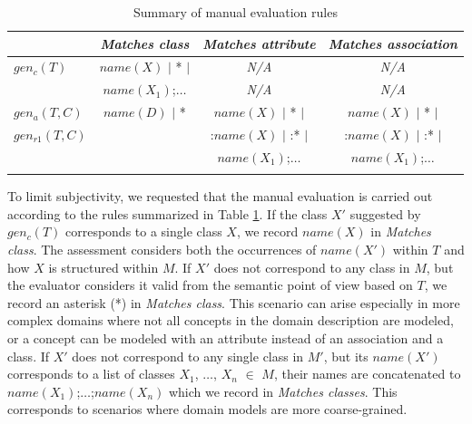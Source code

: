 \begin{table}[!h]
    \scriptsize
    \centering
    \setlength{\tabcolsep}{0.5em}
    \begin{tabular}{lccc}
                     & \emph{Matches class}        & \emph{Matches attribute} & \emph{Matches association} \\
\toprule
\addlinespace
        $gen_c(T)$   & $name(X)$ $\vert$ * $\vert$ & \emph{N/A}  & \emph{N/A} \\
                     & $name(X_1)$;$\ldots$        & \emph{N/A}  & \emph{N/A} \\
\addlinespace
\midrule
\addlinespace
        $gen_a(T,C)$ & $name(D)$ $\vert$ *         & $name(X)$ $\vert$ * $\vert$ & $name(X)$ $\vert$ * $\vert$ \\
        $gen_{r1}(T,C)$ &                             & :$name(X)$ $\vert$ :* $\vert$ & :$name(X)$ $\vert$ :* $\vert$ \\
                     &                             & $name(X_1)$;$\ldots$        & $name(X_1)$;$\ldots$ \\
\addlinespace
\bottomrule
    \end{tabular}
    \caption{Summary of manual evaluation rules}
    \label{tab:manual-assessment-of-suggestions}
\end{table}

To limit subjectivity, we requested that the manual evaluation is carried out according to the rules summarized in Table \ref{tab:manual-assessment-of-suggestions}.
If the class $X'$ suggested by $gen_c(T)$ corresponds to a single class $X$, we record $name(X)$ in \emph{Matches class}.
The assessment considers both the occurrences of $name(X')$ within $T$ and how $X$ is structured within $M$.
If $X'$ does not correspond to any class in $M$, but the evaluator considers it valid from the semantic point of view based on $T$, we record an asterisk (*) in \emph{Matches class}.
This scenario can arise especially in more complex domains where not all concepts in the domain description are modeled, or a concept can be modeled with an attribute instead of an association and a class.
If $X'$ does not correspond to any single class in $M'$, but its $name(X')$ corresponds to a list of classes $X_1$, $\ldots$, $X_n$ $\in$ $M$, their names are concatenated to $name(X_1)$;$\ldots$;$name(X_n)$ which we record in \emph{Matches classes}.
This corresponds to scenarios where domain models are more coarse-grained.

